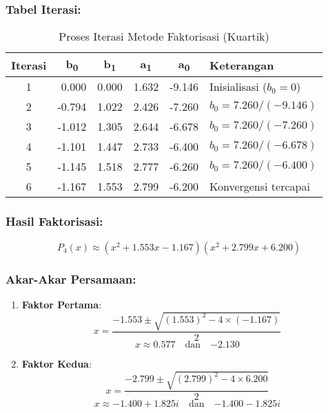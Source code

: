 \documentclass{article}
\begin{document}
\subsubsection*{Tabel Iterasi:}
\begin{table}[h]
\centering
\caption{Proses Iterasi Metode Faktorisasi (Kuartik)}
\begin{tabular}{|c|r|r|r|r|l|}
\hline
\textbf{Iterasi} & \multicolumn{1}{c|}{\textbf{b\textsubscript{0}}} & \multicolumn{1}{c|}{\textbf{b\textsubscript{1}}} & \multicolumn{1}{c|}{\textbf{a\textsubscript{1}}} & \multicolumn{1}{c|}{\textbf{a\textsubscript{0}}} & \textbf{Keterangan} \\ \hline
1 & 0.000 & 0.000 & 1.632 & -9.146 & Inisialisasi ($b_0 = 0$) \\ \hline
2 & -0.794 & 1.022 & 2.426 & -7.260 & $b_0 = 7.260/(-9.146)$ \\ \hline
3 & -1.012 & 1.305 & 2.644 & -6.678 & $b_0 = 7.260/(-7.260)$ \\ \hline
4 & -1.101 & 1.447 & 2.733 & -6.400 & $b_0 = 7.260/(-6.678)$ \\ \hline
5 & -1.145 & 1.518 & 2.777 & -6.260 & $b_0 = 7.260/(-6.400)$ \\ \hline
6 & -1.167 & 1.553 & 2.799 & -6.200 & Konvergensi tercapai \\ \hline
\end{tabular}
\end{table}

\subsubsection*{Hasil Faktorisasi:}
\begin{equation}
    P_4(x) \approx (x^2 + 1.553x - 1.167)(x^2 + 2.799x + 6.200)
\end{equation}

\subsubsection*{Akar-Akar Persamaan:}
\begin{enumerate}
    \item \textbf{Faktor Pertama}:
    \begin{equation}
        x = \frac{-1.553 \pm \sqrt{(1.553)^2 - 4 \times (-1.167)}}{2}
    \end{equation}
    \begin{equation}
        x \approx \boxed{0.577} \quad \text{dan} \quad \boxed{-2.130}
    \end{equation}
    
    \item \textbf{Faktor Kedua}:
    \begin{equation}
        x = \frac{-2.799 \pm \sqrt{(2.799)^2 - 4 \times 6.200}}{2}
    \end{equation}
    \begin{equation}
        x \approx \boxed{-1.400 + 1.825i} \quad \text{dan} \quad \boxed{-1.400 - 1.825i}
    \end{equation}
\end{enumerate}
\end{document}
